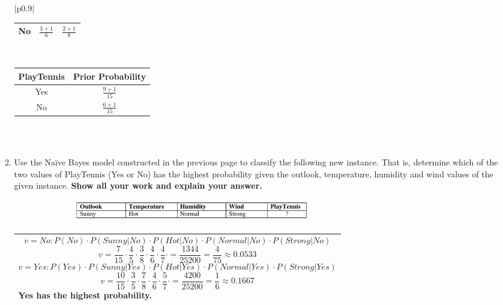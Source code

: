 \documentclass[10pt]{article}
\newenvironment{answer}
    {\begin{center}
    \begin{tabular}{|p{0.9\textwidth}|}
    \hline
    }
    { 
    \\\hline
    \end{tabular} 
    \end{center}
    }
\begin{document}
\begin{enumerate}[resume]
\begin{enumerate}
\begin{answer}
\begin{minipage}{0.1\linewidth}
\begin{tabular}{|c|c|c|}
          \hline
          No & $\frac{3+1}{6}$ & $\frac{2+1}{8}$ \\
          \hline
        \end{tabular}
      \end{minipage}
      \\
      \begin{center}
      \begin{minipage}{0.4\linewidth}
        \begin{tabular}{|c|c|}
          \hline
          PlayTennis & Prior Probability \\
          \hline
          Yes & $\frac{9+1}{15}$ \\
          \hline
          No & $\frac{6+1}{15}$ \\
          \hline
        \end{tabular}
      \end{minipage}
    \end{center}
      \\
    \end{answer}
    \item Use the Naïve Bayes model constructed in the previous page to classify the following new instance.
      That is, determine which of the two values of PlayTennis (Yes or No) has the highest probability
      given the outlook, temperature, humidity and wind values of the given instance. \textbf{Show all your work and explain your answer.}
    \begin{figure}[h!]
      \centering
      \includegraphics[width=0.7\textwidth,height=1cm]{hw3_7.png}
    \end{figure}
    \begin{answer}
      \[ v = No: P(No)\cdot P(Sunny|No)\cdot P(Hot|No)\cdot P(Normal|No)\cdot P(Strong|No) \]
      \[ v = \frac{7}{15}\cdot \frac{4}{5}\cdot \frac{3}{8}\cdot \frac{4}{6}\cdot \frac{4}{7}\cdot = \frac{1344}{25200} = \frac{4}{75} \approx 0.0533 \]
      \[ v = Yes: P(Yes)\cdot P(Sunny|Yes)\cdot P(Hot|Yes)\cdot P(Normal|Yes)\cdot P(Strong|Yes) \]
      \[ v = \frac{10}{15}\cdot \frac{3}{5}\cdot \frac{7}{8}\cdot \frac{4}{6}\cdot \frac{5}{7}\cdot = \frac{4200}{25200} = \frac{1}{6} \approx 0.1667 \]
      Yes has the highest probability.
    \end{answer}
    \end{enumerate}
  \end{enumerate}
\end{document}
